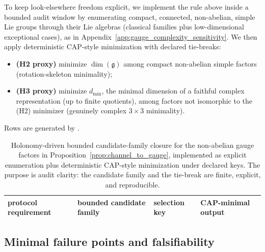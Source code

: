 \AuditTag To keep look-elsewhere freedom explicit, we implement the rule above inside a bounded audit window by enumerating compact, connected, non-abelian, simple Lie groups through their Lie algebras (classical families plus low-dimensional exceptional cases), as in Appendix~\ref{app:gauge_complexity_sensitivity}.
We then apply deterministic CAP-style minimization with declared tie-breaks:
\begin{itemize}
  \item \textbf{(H2 proxy)} minimize $\dim(\mathfrak{g})$ among compact non-abelian simple factors (rotation-skeleton minimality);
  \item \textbf{(H3 proxy)} minimize $d_{\min}$, the minimal dimension of a faithful complex representation (up to finite quotients), among factors not isomorphic to the (H2) minimizer (genuinely complex $3\times 3$ minimality).
\end{itemize}

Rows are generated by .

\begin{table}[H]
\centering
\small
\setlength{\tabcolsep}{6pt}
\renewcommand{\arraystretch}{1.15}
\begin{tabular}{p{}p{}p{}p{}}
\toprule
protocol requirement & bounded candidate family & selection key & CAP-minimal output \\
\midrule
%
\end{tabular}
\caption{Holonomy-driven bounded candidate-family closure for the non-abelian gauge factors in Proposition~\ref{prop:channel_to_gauge}, implemented as explicit enumeration plus deterministic CAP-style minimization under declared keys.
The purpose is audit clarity: the candidate family and the tie-break are finite, explicit, and reproducible.}
\label{tab:gauge3_holonomy_candidate_closure}
\end{table}

\subsection{Minimal failure points and falsifiability}
\label{subsec:gauge3_failure_falsifiability}

